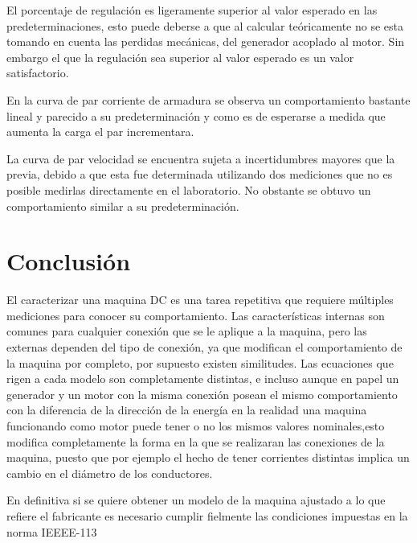 \documentclass[11pt,letterpaper]{article}     %
\begin{document}
El porcentaje de regulación es ligeramente superior al valor esperado en las predeterminaciones, esto puede deberse a que al calcular teóricamente no se esta tomando en cuenta las perdidas mecánicas, del generador acoplado al motor. Sin embargo el que la regulación sea superior al valor esperado es un valor satisfactorio.

En la curva de par corriente de armadura se observa un comportamiento bastante lineal y parecido a su predeterminación y como es de esperarse a medida que aumenta la carga el par incrementara.

La curva de par velocidad se encuentra sujeta a incertidumbres mayores que la previa, debido a que esta fue determinada utilizando dos mediciones que no es posible medirlas directamente en el laboratorio. No obstante se obtuvo un comportamiento similar a su predeterminación. 
\newpage 
  \section{Conclusión}
  El caracterizar una maquina DC es una tarea repetitiva que requiere múltiples mediciones para conocer su comportamiento. Las características internas son comunes para cualquier conexión que se le aplique a la maquina, pero las externas dependen del tipo de conexión, ya que modifican el comportamiento de la maquina por completo, por supuesto existen similitudes. Las ecuaciones que rigen a cada modelo son completamente distintas, e incluso aunque en papel un generador y un motor con la misma conexión posean el mismo comportamiento con la diferencia de la dirección de la energía en la realidad una maquina funcionando como motor puede tener o no los mismos valores nominales,esto modifica completamente la forma en la que se realizaran las conexiones de la maquina, puesto que por ejemplo el hecho de tener corrientes distintas implica un cambio en el diámetro de los conductores.
  
  En definitiva si se quiere obtener un modelo de la maquina ajustado a lo que refiere el fabricante es necesario cumplir fielmente las condiciones impuestas en la norma IEEEE-113 
\newpage
\end{document}

